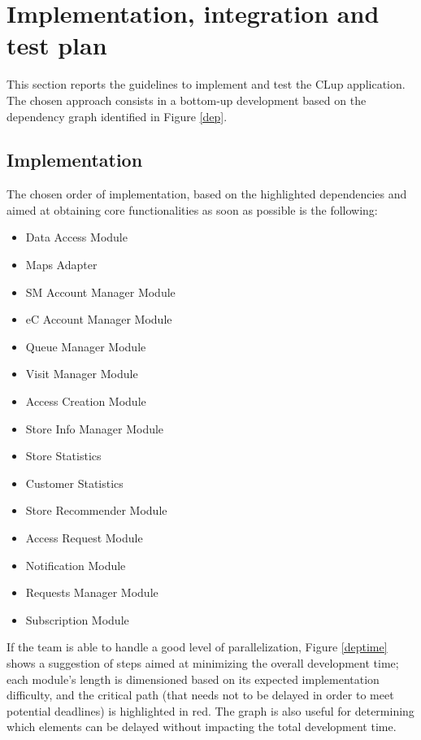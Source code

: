 
\section{Implementation, integration and test plan}
\label{sect:iit}
This section reports the guidelines to implement and test the CLup application. The chosen approach consists in a bottom-up development based on the dependency graph identified in Figure \ref{dep}.

\subsection{Implementation}
The chosen order of implementation, based on the highlighted dependencies and aimed at obtaining core functionalities as soon as possible is the following:
\begin{itemize}[itemsep=-1mm, topsep=-1mm]
	\item Data Access Module
	\item Maps Adapter
	\item SM Account Manager Module
	\item eC Account Manager Module
	\item Queue Manager Module
	\item Visit Manager Module
	\item Access Creation Module
	\item Store Info Manager Module
	\item Store Statistics
	\item Customer Statistics
	\item Store Recommender Module
	\item Access Request Module
	\item Notification Module
	\item Requests Manager Module
	\item Subscription Module
\end{itemize}\vspace{.5\baselineskip} 

If the team is able to handle a good level of parallelization, Figure \ref{deptime} shows a suggestion of steps aimed at minimizing the overall development time; each module's length is dimensioned based on its expected implementation difficulty, and the critical path (that needs not to be delayed in order to meet potential deadlines) is highlighted in red. The graph is also useful for determining which elements can be delayed without impacting the total development time.

